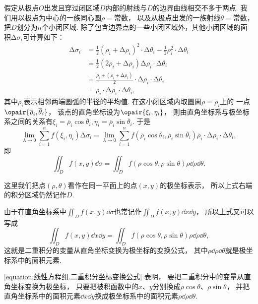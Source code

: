 假定从极点\(O\)出发且穿过闭区域\(D\)内部的射线与\(D\)的边界曲线相交不多于两点.
我们用以极点为中心的一族同心圆\(\rho = \text{常数}\)，
以及从极点出发的一族射线\(\theta = \text{常数}\)，
把\(D\)划分为\(n\)个小闭区域.
除了包含边界点的一些小闭区域外，其他小闭区域的面积\(\increment\sigma_i\)可计算如下：
\begin{align*}
	\increment\sigma_i
	&= \frac{1}{2} (\rho_i+\increment\rho_i)^2 \cdot \increment\theta_i
	- \frac{1}{2} \rho_i^2 \cdot \increment\theta_i \\
	&= \frac{1}{2} (2\rho_i + \increment\rho_i) \increment\rho_i \cdot \increment\theta_i \\
	&= \frac{\rho_i + (\rho_i+\increment\rho_i)}{2}
		\cdot \increment\rho_i \cdot \increment\theta_i \\
	&= \overline{\rho}_i \cdot \increment\rho_i \cdot \increment\theta_i,
\end{align*}
其中\(\overline{\rho}_i\)表示相邻两端圆弧的半径的平均值.
在这小闭区域内取圆周\(\rho = \overline{\rho}_i\)上的
一点\(\opair{\overline{\rho}_i,\overline{\theta}_i}\)，
该点的直角坐标设为\(\opair{\xi_i,\eta_i}\)，
则由直角坐标系与极坐标系之间的关系有\(\xi_i = \overline{\rho}_i \cos\overline{\theta}_i,
\eta_i = \overline{\rho}_i \sin\overline{\theta}_i\).
于是\[
	\lim_{\lambda\to0} \sum_{i=1}^n f(\xi_i,\eta_i) \increment\sigma_i
	= \lim_{\lambda\to0} \sum_{i=1}^n
	f(\overline{\rho}_i \cos\overline{\theta}_i,\overline{\rho}_i \sin\overline{\theta}_i)
	\overline{\rho}_i \cdot \increment\rho_i \cdot \increment\theta_i,
\]
即\[
	\iint_D f(x,y) \dd\sigma
	= \iint_D f(\rho\cos\theta,\rho\sin\theta) \rho \dd{\rho} \dd{\theta}.
\]

这里我们把点\((\rho,\theta)\)看作在同一平面上的点\((x,y)\)的极坐标表示，
所以上式右端的积分区域仍然记作\(D\).

由于在直角坐标系中\(\iint_D f(x,y) \dd\sigma\)也常记作\(\iint_D f(x,y) \dd{x} \dd{y}\)，
所以上式又可以写成
\begin{equation}\label{equation:线性方程组.二重积分坐标变换公式}
\iint_D f(x,y) \dd{x} \dd{y}
= \iint_D f(\rho\cos\theta,\rho\sin\theta) \rho \dd{\rho} \dd{\theta},
\end{equation}
这就是二重积分的变量从直角坐标变换为极坐标的变换公式，
其中\(\rho \dd{\rho} \dd{\theta}\)就是极坐标系中的面积元素.

\cref{equation:线性方程组.二重积分坐标变换公式} 表明，
要把二重积分中的变量从直角坐标变换为极坐标，
只要把被积函数中的\(x\)、\(y\)分别换成\(\rho \cos\theta\)、\(\rho \sin\theta\)，
并把直角坐标系中的面积元素\(\dd{x} \dd{y}\)换成极坐标系中的面积元素\(\rho \dd{\rho} \dd{\theta}\).

